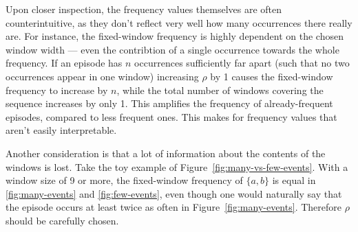 Upon closer inspection, the frequency values themselves are often counterintuitive, as they don't reflect very well how many occurrences there really are. For instance, the fixed-window frequency is highly dependent on the chosen window width --- even the contribtion of a single occurrence towards the whole frequency. If an episode has $ n $ occurrences sufficiently far apart (such that no two occurrences appear in one window) increasing $ \rho $ by 1 causes the fixed-window frequency to increase by $ n $, while the total number of windows covering the sequence increases by only 1. This amplifies the frequency of already-frequent episodes, compared to less frequent ones. This makes for frequency values that aren't easily interpretable.

Another consideration is that a lot of information about the contents of the windows is lost. Take the toy example of Figure~\ref{fig:many-vs-few-events}. With a window size of 9 or more, the fixed-window frequency of $ \{ a, b \} $ is equal in \ref{fig:many-events} and \ref{fig:few-events}, even though one would naturally say that the episode occurs at least twice as often in Figure~\ref{fig:many-events}. Therefore $ \rho $ should be carefully chosen.

